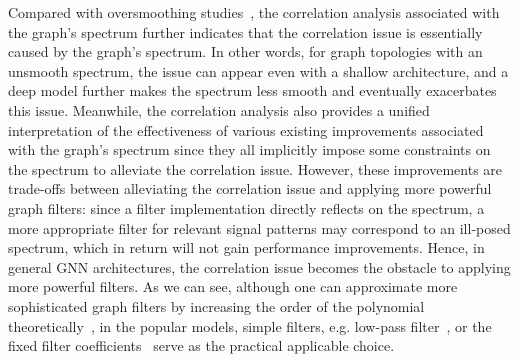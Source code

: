 \documentclass[nohyperref]{article}
\theoremstyle{plain}
\theoremstyle{definition}
\theoremstyle{remark}
\begin{document}
Compared with oversmoothing studies~\cite{li2018deeper,oono2020graph,rong2019dropedge,huang2020tackling}, the correlation analysis associated with the graph's spectrum further indicates that the correlation issue is essentially caused by the graph's spectrum. In other words, for graph topologies with an unsmooth spectrum, the issue can appear even with a shallow architecture, and a deep model further makes the spectrum less smooth and eventually exacerbates this issue. Meanwhile, the correlation analysis also provides a unified interpretation of the effectiveness of various existing improvements associated with the graph's spectrum since they all implicitly impose some constraints on the spectrum to alleviate the correlation issue. However, these improvements are trade-offs between alleviating the correlation issue and applying more powerful graph filters: since a filter implementation directly reflects on the spectrum, a more appropriate filter for relevant signal patterns may correspond to an ill-posed spectrum, which in return will not gain performance improvements. Hence, in general GNN architectures, the correlation issue becomes the obstacle to applying more powerful filters.
As we can see, although one can approximate more sophisticated graph filters by increasing the order  of the polynomial theoretically~\cite{shuman2013emerging}, in the popular models, simple filters, e.g. low-pass filter~\cite{kipf2017semi,pmlr-v97-wu19e}, or the fixed filter coefficients~\cite{klicpera_predict_2019,klicpera2019diffusion} serve as the practical applicable choice.
\end{document}
